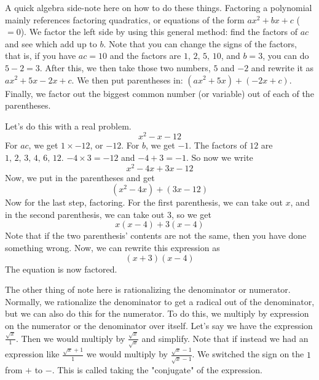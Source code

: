A quick algebra side-note here on how to do these things. 
Factoring a polynomial mainly references factoring quadratics, or equations of the form $ax^2 + bx + c$ ($=0$). 
We factor the left side by using this general method: find the factors of $ac$ and see which add up to $b$. 
Note that you can change the signs of the factors, that is, if you have $ac = 10$ and the factors are $1, \, 2, \, 5, \, 10$, and $b = 3$, you can do $5-2 = 3$. 
After this, we then take those two numbers, $5$ and $-2$ and rewrite it as $ax^2 + 5x -2x + c$. 
We then put parentheses in: $(ax^2 + 5x) + (-2x + c)$. 
Finally, we factor out the biggest common number (or variable) out of each of the parentheses.

Let's do this with a real problem. 
\begin{equation*}
    x^2 - x - 12
\end{equation*}
For $ac$, we get $1\times -12$, or $-12$. 
For $b$, we get $-1$. 
The factors of $12$ are $1, \, 2, \, 3, \, 4, \, 6, \, 12$. $-4\times 3 = -12$ and $-4+3 = -1$. 
So now we write 
\begin{equation*}
    x^2 - 4x + 3x - 12
\end{equation*}
Now, we put in the parentheses and get
\begin{equation*}
    (x^2-4x)+(3x-12)
\end{equation*}
Now for the last step, factoring. 
For the first parenthesis, we can take out $x$, and in the second parenthesis, we can take out $3$, so we get
\begin{equation*}
    x(x-4)+3(x-4)
\end{equation*}
Note that if the two parenthesis' contents are not the same, then you have done something wrong. 
Now, we can rewrite this expression as 
\begin{equation*}
    (x+3)(x-4)
\end{equation*}
The equation is now factored.

The other thing of note here is rationalizing the denominator or numerator. 
Normally, we rationalize the denominator to get a radical out of the denominator, but we can also do this for the numerator. 
To do this, we multiply by expression on the numerator or the denominator over itself. 
Let's say we have the expression $\frac{\sqrt{x}}{1}$. 
Then we would multiply by $\frac{\sqrt{x}}{\sqrt{x}}$ and simplify. 
Note that if instead we had an expression like $\frac{\sqrt{x}+1}{1}$ we would multiply by $\frac{\sqrt{x}-1}{\sqrt{x}-1}$. 
We switched the sign on the $1$ from $+$ to $-$. This is called taking the "conjugate" of the expression.

